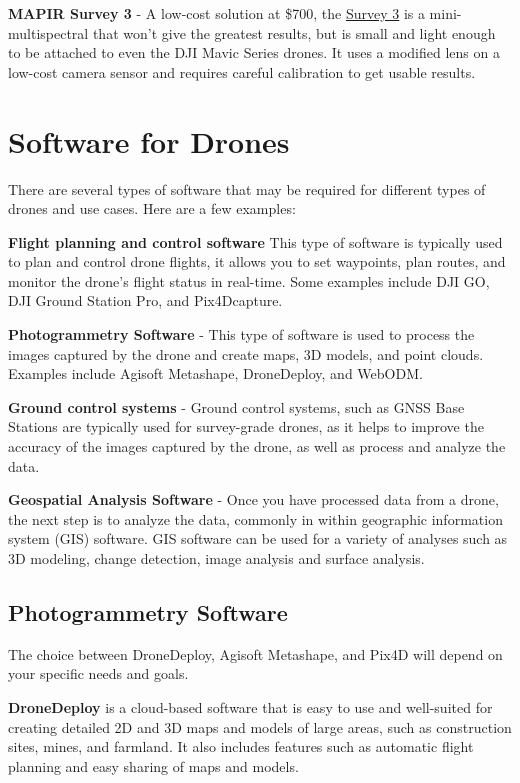 \documentclass[
  12pt,
]{book}
\begin{document}
\textbf{MAPIR Survey 3} - A low-cost solution at \$700, the \href{https://www.mapir.camera/pages/survey3-cameras}{Survey 3} is a mini-multispectral that won't give the greatest results, but is small and light enough to be attached to even the DJI Mavic Series drones. It uses a modified lens on a low-cost camera sensor and requires careful calibration to get usable results.

\section{Software for Drones}\label{software-for-drones}

There are several types of software that may be required for different types of drones and use cases. Here are a few examples:

\textbf{Flight planning and control software} This type of software is typically used to plan and control drone flights, it allows you to set waypoints, plan routes, and monitor the drone's flight status in real-time. Some examples include DJI GO, DJI Ground Station Pro, and Pix4Dcapture.

\textbf{Photogrammetry Software} - This type of software is used to process the images captured by the drone and create maps, 3D models, and point clouds. Examples include Agisoft Metashape, DroneDeploy, and WebODM.

\textbf{Ground control systems} - Ground control systems, such as GNSS Base Stations are typically used for survey-grade drones, as it helps to improve the accuracy of the images captured by the drone, as well as process and analyze the data.

\textbf{Geospatial Analysis Software} - Once you have processed data from a drone, the next step is to analyze the data, commonly in within geographic information system (GIS) software. GIS software can be used for a variety of analyses such as 3D modeling, change detection, image analysis and surface analysis.

\subsection{Photogrammetry Software}\label{photogrammetry-software}

The choice between DroneDeploy, Agisoft Metashape, and Pix4D will depend on your specific needs and goals.

\textbf{DroneDeploy} is a cloud-based software that is easy to use and well-suited for creating detailed 2D and 3D maps and models of large areas, such as construction sites, mines, and farmland. It also includes features such as automatic flight planning and easy sharing of maps and models.
\end{document}
